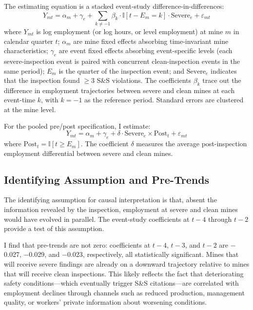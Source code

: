 \documentclass[12pt]{article}
\newcommand{\ind}{\mathbb{I}}
\begin{document}
The estimating equation is a stacked event-study difference-in-differences:
\begin{equation}
Y_{mt} = \alpha_m + \gamma_{e} + \sum_{k \neq -1} \beta_k \cdot \ind[t - E_m = k] \cdot \text{Severe}_e + \varepsilon_{mt}
\label{eq:main}
\end{equation}
where $Y_{mt}$ is log employment (or log hours, or level employment) at mine $m$ in calendar quarter $t$; $\alpha_m$ are mine fixed effects absorbing time-invariant mine characteristics; $\gamma_e$ are event fixed effects absorbing event-specific levels (each severe-inspection event is paired with concurrent clean-inspection events in the same period); $E_m$ is the quarter of the inspection event; and $\text{Severe}_e$ indicates that the inspection found $\geq$3 S\&S violations. The coefficients $\beta_k$ trace out the difference in employment trajectories between severe and clean mines at each event-time $k$, with $k = -1$ as the reference period. Standard errors are clustered at the mine level.

For the pooled pre/post specification, I estimate:
\begin{equation}
Y_{mt} = \alpha_m + \gamma_e + \delta \cdot \text{Severe}_e \times \text{Post}_{t} + \varepsilon_{mt}
\label{eq:did}
\end{equation}
where $\text{Post}_t = \ind[t \geq E_m]$. The coefficient $\delta$ measures the average post-inspection employment differential between severe and clean mines.

\subsection{Identifying Assumption and Pre-Trends}

The identifying assumption for causal interpretation is that, absent the information revealed by the inspection, employment at severe and clean mines would have evolved in parallel. The event-study coefficients at $t-4$ through $t-2$ provide a test of this assumption.

I find that pre-trends are not zero: coefficients at $t-4$, $t-3$, and $t-2$ are $-$0.027, $-$0.029, and $-$0.023, respectively, all statistically significant. Mines that will receive severe findings are already on a downward trajectory relative to mines that will receive clean inspections. This likely reflects the fact that deteriorating safety conditions---which eventually trigger S\&S citations---are correlated with employment declines through channels such as reduced production, management quality, or workers' private information about worsening conditions.
\end{document}
